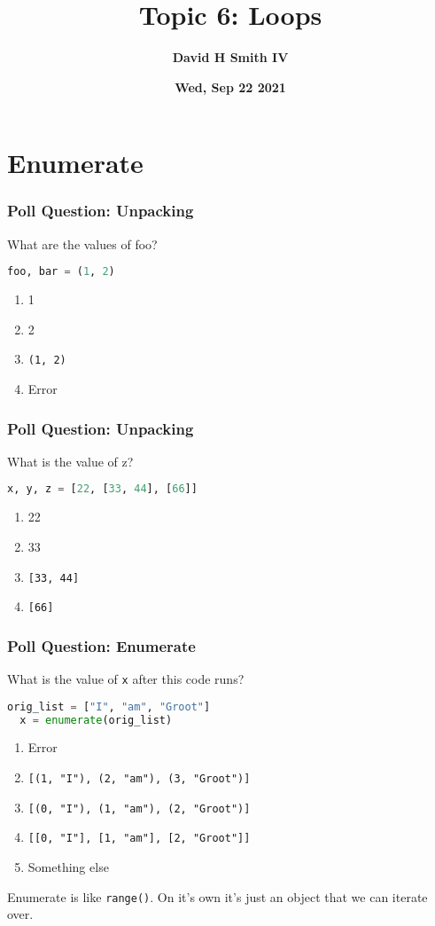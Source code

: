 \documentclass{beamer}
\title{\textbf{Topic 6: Loops}}
\author{\textbf{David H Smith IV}}
\institute[\textbf{UIUC}]{\textbf{University of Illinois Urbana-Champaign}}
\date{\textbf{Wed, Sep 22 2021}}
\begin{document}
\frame{\titlepage}

\section{Enumerate}

%
%
\begin{frame}[fragile]
  \frametitle{Poll Question: Unpacking}
  What are the values of foo?
  \begin{lstlisting}[language=Python, autogobble]
  foo, bar = (1, 2)
  \end{lstlisting}
  \vfill
  \begin{enumerate}[A]
    \item 1
    \item 2
    \item \lstinline|(1, 2)|
    \item Error
  \end{enumerate}
\end{frame}

%
%
\begin{frame}[fragile]
  \frametitle{Poll Question: Unpacking}
  What is the value of z?
  \begin{lstlisting}[language=Python, autogobble]
  x, y, z = [22, [33, 44], [66]]
  \end{lstlisting}
  \vfill
  \begin{enumerate}[A]
    \item 22
    \item 33
    \item \lstinline|[33, 44]|
    \item \lstinline|[66]|
  \end{enumerate}
\end{frame}


%
%
\begin{frame}[fragile]
  \frametitle{Poll Question: Enumerate}
  What is the value of \lstinline|x| after this code runs?
  \begin{lstlisting}[language=Python, autogobble]
  orig_list = ["I", "am", "Groot"]
  x = enumerate(orig_list)
  \end{lstlisting}
  \vfill
  \begin{enumerate}[A]
    \item Error
    \item \lstinline|[(1, "I"), (2, "am"), (3, "Groot")]|
    \item \lstinline|[(0, "I"), (1, "am"), (2, "Groot")]|
    \item \lstinline|[[0, "I"], [1, "am"], [2, "Groot"]]|
    \item Something else
  \end{enumerate}
  \pause
  Enumerate is like \lstinline|range()|. On it's own it's just an object that we can iterate over.
\end{frame}
\end{document}

